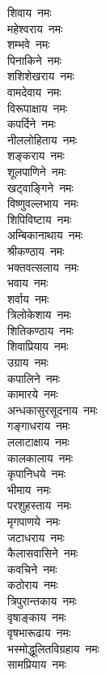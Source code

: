 \begin{multicols}{\maxColumns}
\begin{flushleft}
शिवाय~नमः\\
महेश्वराय~नमः\\
शम्भवे~नमः\\
पिनाकिने~नमः\\
शशिशेखराय~नमः\\
वामदेवाय~नमः\\
विरूपाक्षाय~नमः\\
कपर्दिने~नमः\\
नीललोहिताय~नमः\\
शङ्कराय~नमः\hfill{}\\
शूलपाणिने~नमः\\
खट्वाङ्गिने~नमः\\
विष्णुवल्लभाय~नमः\\
शिपिविष्टाय~नमः\\
अम्बिकानाथाय~नमः\\
श्रीकण्ठाय~नमः\\
भक्तवत्सलाय~नमः\\
भवाय~नमः\\
शर्वाय~नमः\\
त्रिलोकेशाय~नमः\hfill{}\\
शितिकण्ठाय~नमः\\
शिवाप्रियाय~नमः\\
उग्राय~नमः\\
कपालिने~नमः\\
कामारये~नमः\\
अन्धकासुरसूदनाय~नमः\\
गङ्गाधराय~नमः\\
ललाटाक्षाय~नमः\\
कालकालाय~नमः\\
कृपानिधये~नमः\hfill{}\\
भीमाय~नमः\\
परशुहस्ताय~नमः\\
मृगपाणये~नमः\\
जटाधराय~नमः\\
कैलासवासिने~नमः\\
कवचिने~नमः\\
कठोराय~नमः\\
त्रिपुरान्तकाय~नमः\\
वृषाङ्काय~नमः\\
वृषभारूढाय~नमः\hfill{}\\
भस्मोद्धूलितविग्रहाय~नमः\\
सामप्रियाय~नमः\\

\end{flushleft}
\end{multicols}
